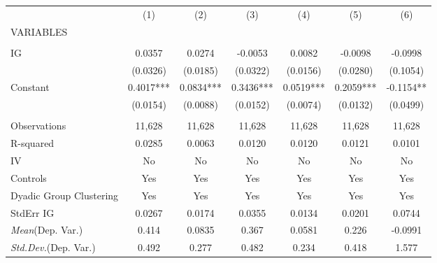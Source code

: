 \documentclass[]{article}
\begin{document}
\begin{tabular}{lcccccc} \hline
 & (1) & (2) & (3) & (4) & (5) & (6) \\
VARIABLES &  &  &  &  &  &  \\ \hline
 &  &  &  &  &  &  \\
IG & 0.0357 & 0.0274 & -0.0053 & 0.0082 & -0.0098 & -0.0998 \\
 & (0.0326) & (0.0185) & (0.0322) & (0.0156) & (0.0280) & (0.1054) \\
Constant & 0.4017*** & 0.0834*** & 0.3436*** & 0.0519*** & 0.2059*** & -0.1154** \\
 & (0.0154) & (0.0088) & (0.0152) & (0.0074) & (0.0132) & (0.0499) \\
 &  &  &  &  &  &  \\
Observations & 11,628 & 11,628 & 11,628 & 11,628 & 11,628 & 11,628 \\
R-squared & 0.0285 & 0.0063 & 0.0120 & 0.0120 & 0.0121 & 0.0101 \\
IV & No & No & No & No & No & No \\
Controls & Yes & Yes & Yes & Yes & Yes & Yes \\
Dyadic Group Clustering & Yes & Yes & Yes & Yes & Yes & Yes \\
StdErr IG & 0.0267 & 0.0174 & 0.0355 & 0.0134 & 0.0201 & 0.0744 \\
\textit{Mean}(Dep. Var.) & 0.414 & 0.0835 & 0.367 & 0.0581 & 0.226 & -0.0991 \\
 \textit{Std.Dev.}(Dep. Var.) & 0.492 & 0.277 & 0.482 & 0.234 & 0.418 & 1.577 \\ \hline
\end{tabular}
\end{document}
